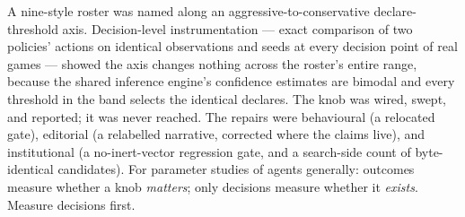 \documentclass[11pt]{article}
\begin{document}
A nine-style roster was named along an aggressive-to-conservative declare-threshold axis.
Decision-level instrumentation --- exact comparison of two policies' actions on identical
observations and seeds at every decision point of real games --- showed the axis changes nothing
across the roster's entire range, because the shared inference engine's confidence estimates are
bimodal and every threshold in the band selects the identical declares. The knob was wired,
swept, and reported; it was never reached. The repairs were behavioural (a relocated gate),
editorial (a relabelled narrative, corrected where the claims live), and institutional (a
no-inert-vector regression gate, and a search-side count of byte-identical candidates). For
parameter studies of agents generally: outcomes measure whether a knob \emph{matters}; only
decisions measure whether it \emph{exists}. Measure decisions first.
\end{document}
